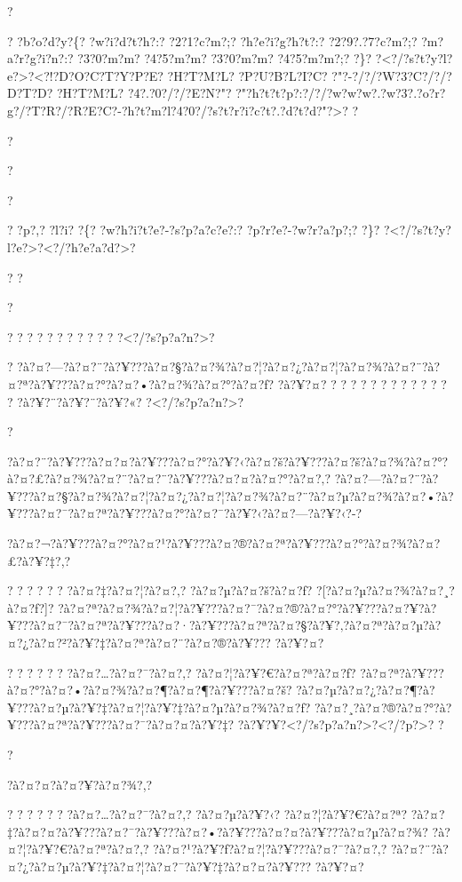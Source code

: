 \documentclass[11pt, openany]{book}
\begin{document}
{{{{{{{{{{{{{{{{{{{?

? ?b?o?d?y?\{? ?w?i?d?t?h?:? ?2?1?c?m?;? ?h?e?i?g?h?t?:? ?2?9?.?7?c?m?;?
?m?a?r?g?i?n?:? ?3?0?m?m? ?4?5?m?m? ?3?0?m?m? ?4?5?m?m?;? ?\}?
?\textless{}?/?s?t?y?l?e?\textgreater{}?\textless{}?!?D?O?C?T?Y?P?E?
?H?T?M?L? ?P?U?B?L?I?C? ?"?-?/?/?W?3?C?/?/?D?T?D? ?H?T?M?L?
?4?.?0?/?/?E?N?"?
?"?h?t?t?p?:?/?/?w?w?w?.?w?3?.?o?r?g?/?T?R?/?R?E?C?-?h?t?m?l?4?0?/?s?t?r?i?c?t?.?d?t?d?"?\textgreater{}?
?

?

?

?

? ?p?,? ?l?i? ?\{? ?w?h?i?t?e?-?s?p?a?c?e?:? ?p?r?e?-?w?r?a?p?;? ?\}?
?\textless{}?/?s?t?y?l?e?\textgreater{}?\textless{}?/?h?e?a?d?\textgreater{}?

? ?

?

? ? ? ? ? ? ? ? ? ? ? ?\textless{}?/?s?p?a?n?\textgreater{}?

?
?à?¤?---?à?¤?¨?à?¥???à?¤?§?à?¤?¾?à?¤?¦?à?¤?¿?à?¤?¦?à?¤?¾?à?¤?¨?à?¤?ª?à?¥???à?¤?°?à?¤?•?à?¤?¾?à?¤?°?à?¤?ƒ?
?à?¥?¤? ? ? ? ? ? ? ? ? ? ? ? ? ? ?à?¥?¨?à?¥?¨?à?¥?«?
?\textless{}?/?s?p?a?n?\textgreater{}?

?

?à?¤?¨?à?¥???à?¤?¤?à?¥???à?¤?°?à?¥?‹?à?¤?š?à?¥???à?¤?š?à?¤?¾?à?¤?°?à?¤?£?à?¤?¾?à?¤?¨?à?¤?¨?à?¥???à?¤?¤?à?¤?°?à?¤?‚?
?à?¤?---?à?¤?¨?à?¥???à?¤?§?à?¤?¾?à?¤?¦?à?¤?¿?à?¤?¦?à?¤?¾?à?¤?¨?à?¤?µ?à?¤?¾?à?¤?•?à?¥???à?¤?¯?à?¤?ª?à?¥???à?¤?°?à?¤?¯?à?¥?‹?à?¤?---?à?¥?‹?-?

?à?¤?¬?à?¥???à?¤?°?à?¤?¹?à?¥???à?¤?®?à?¤?ª?à?¥???à?¤?°?à?¤?¾?à?¤?£?à?¥?‡?,?

? ? ? ? ? ? ?à?¤?‡?à?¤?¦?à?¤?‚? ?à?¤?µ?à?¤?š?à?¤?ƒ?
?[?à?¤?µ?à?¤?¾?à?¤?¸?à?¤?ƒ?]?
?à?¤?ª?à?¤?¾?à?¤?¦?à?¥???à?¤?¯?à?¤?®?à?¤?°?à?¥???à?¤?¥?à?¥???à?¤?¯?à?¤?ª?à?¥???à?¤?·?à?¥???à?¤?ª?à?¤?§?à?¥?‚?à?¤?ª?à?¤?µ?à?¤?¿?à?¤?²?à?¥?‡?à?¤?ª?à?¤?¨?à?¤?®?à?¥???
?à?¥?¤?

? ? ? ? ? ? ?à?¤?\ldots{}?à?¤?¯?à?¤?‚? ?à?¤?¦?à?¥?€?à?¤?ª?à?¤?ƒ?
?à?¤?ª?à?¥???à?¤?°?à?¤?•?à?¤?¾?à?¤?¶?à?¤?¶?à?¥???à?¤?š?
?à?¤?µ?à?¤?¿?à?¤?¶?à?¥???à?¤?µ?à?¥?‡?à?¤?¦?à?¥?‡?à?¤?µ?à?¤?¾?à?¤?ƒ?
?à?¤?¸?à?¤?®?à?¤?°?à?¥???à?¤?ª?à?¥???à?¤?¯?à?¤?¤?à?¥?‡?
?à?¥?¥?\textless{}?/?s?p?a?n?\textgreater{}?\textless{}?/?p?\textgreater{}?
?

?

?à?¤?¤?à?¤?¥?à?¤?¾?,?

? ? ? ? ? ? ?à?¤?\ldots{}?à?¤?¯?à?¤?‚? ?à?¤?µ?à?¥?‹? ?à?¤?¦?à?¥?€?à?¤?ª?
?à?¤?‡?à?¤?¤?à?¥???à?¤?¯?à?¥???à?¤?•?à?¥???à?¤?¤?à?¥???à?¤?µ?à?¤?¾?
?à?¤?¦?à?¥?€?à?¤?ª?à?¤?‚? ?à?¤?¹?à?¥?ƒ?à?¤?¦?à?¥???à?¤?¯?à?¤?‚?
?à?¤?¨?à?¤?¿?à?¤?µ?à?¥?‡?à?¤?¦?à?¤?¯?à?¥?‡?à?¤?¤?à?¥??? ?à?¥?¤?

}}}}}}}}}}}}}}}}}}}
\end{document}
